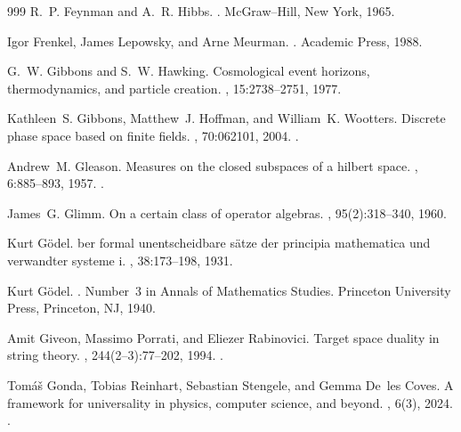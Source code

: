 \begin{thebibliography}{999}
R.~P. Feynman and A.~R. Hibbs.
.
\newblock McGraw--Hill, New York, 1965.

Igor Frenkel, James Lepowsky, and Arne Meurman.
.
\newblock Academic Press, 1988.

G.~W. Gibbons and S.~W. Hawking.
\newblock Cosmological event horizons, thermodynamics, and particle creation.
, 15:2738--2751, 1977.

Kathleen~S. Gibbons, Matthew~J. Hoffman, and William~K. Wootters.
\newblock Discrete phase space based on finite fields.
, 70:062101, 2004.
\newblock \href {https://doi.org/10.1103/PhysRevA.70.062101}
  {}.

Andrew~M. Gleason.
\newblock Measures on the closed subspaces of a hilbert space.
, 6:885--893, 1957.
\newblock \href {https://doi.org/10.1512/iumj.1957.6.56050}
  {}.

James~G. Glimm.
\newblock On a certain class of operator algebras.
,
  95(2):318--340, 1960.

Kurt G{\"o}del.
ber formal unentscheidbare s{\"a}tze der principia mathematica
  und verwandter systeme i.
, 38:173--198, 1931.

Kurt G{\"o}del.
.
\newblock Number~3 in Annals of Mathematics Studies. Princeton University
  Press, Princeton, NJ, 1940.

Amit Giveon, Massimo Porrati, and Eliezer Rabinovici.
\newblock Target space duality in string theory.
, 244(2--3):77--202, 1994.
\newblock \href {https://doi.org/10.1016/0370-1573(94)90070-1}
  {}.

Tom{\'a}{\v{s}} Gonda, Tobias Reinhart, Sebastian Stengele, and Gemma De~les
  Coves.
\newblock A framework for universality in physics, computer science, and
  beyond.
, 6(3), 2024.
\newblock \href {https://doi.org/10.46298/compositionality-6-3}
  {}.


\end{thebibliography}
